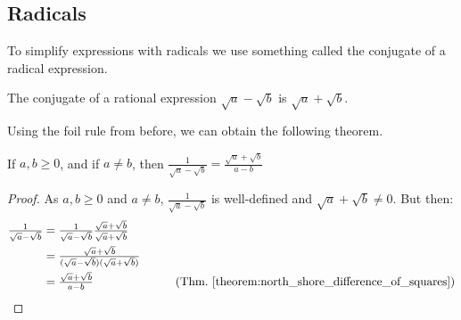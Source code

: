\documentclass[crop=false,class=book,oneside]{standalone}
\begin{document}
        \subsection{Radicals}
            To simplify expressions with radicals we use something called the conjugate of a radical expression. 
            \begin{definition}
            The conjugate of a rational expression $\sqrt{a}-\sqrt{b}$ is $\sqrt{a}+\sqrt{b}$.
            \end{definition}
            Using the \gls{foil} rule from before, we can obtain the following theorem.
            \begin{theorem}
            If $a,b\geq 0$, and if $a\ne b$, then $\frac{1}{\sqrt{a}-\sqrt{b}}=\frac{\sqrt{a}+\sqrt{b}}{a-b}$
            \end{theorem}
            \begin{proof}
            As $a,b\geq 0$ and $a\ne b$, $\frac{1}{\sqrt{a}-\sqrt{b}}$ is well-defined and $\sqrt{a}+\sqrt{b}\ne 0$. But then:
            \begin{align*}
                \tfrac{1}{\sqrt{a}-\sqrt{b}}&=\tfrac{1}{\sqrt{a}-\sqrt{b}}\tfrac{\sqrt{a}+\sqrt{b}}{\sqrt{a}+\sqrt{b}}\\
                &=\tfrac{\sqrt{a}+\sqrt{b}}{(\sqrt{a}-\sqrt{b})(\sqrt{a}+\sqrt{b})}\\
                &=\tfrac{\sqrt{a}+\sqrt{b}}{a-b}&\tag{Thm.~\ref{theorem:north_shore_difference_of_squares}}
            \end{align*}
            \end{proof}
\end{document}
